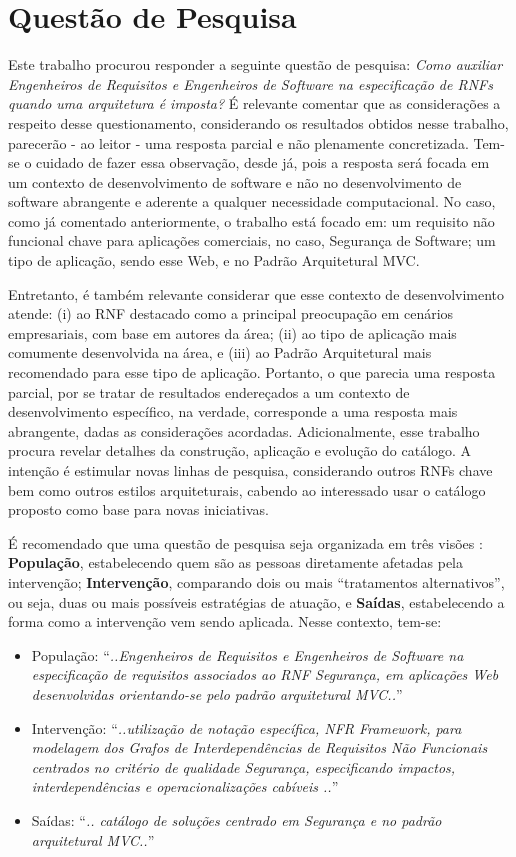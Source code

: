 \section{Questão de Pesquisa}
Este trabalho procurou responder a seguinte questão de pesquisa: \textit{Como auxiliar Engenheiros de Requisitos e Engenheiros de Software na especificação de RNFs quando uma arquitetura é imposta?} É relevante comentar que as considerações a respeito desse questionamento, considerando os resultados obtidos nesse trabalho, parecerão - ao leitor - uma resposta parcial e não plenamente concretizada. Tem-se o cuidado de fazer essa observação, desde já, pois a resposta será focada em um contexto de desenvolvimento de software e não no desenvolvimento de software abrangente e aderente a qualquer necessidade computacional. No caso, como já comentado anteriormente, o trabalho está focado em: um requisito não funcional chave para aplicações comerciais, no caso, Segurança de Software; um tipo de aplicação, sendo esse Web, e no Padrão Arquitetural MVC. 

Entretanto, é também relevante considerar que esse contexto de desenvolvimento atende: (i) ao RNF destacado como a principal preocupação em cenários empresariais, com base em autores da área; (ii) ao tipo de aplicação mais comumente desenvolvida na área, e (iii) ao Padrão Arquitetural mais recomendado para esse tipo de aplicação. Portanto, o que parecia uma resposta parcial, por se tratar de resultados endereçados a um contexto de desenvolvimento específico, na verdade, corresponde a uma resposta mais abrangente, dadas as considerações acordadas. Adicionalmente, esse trabalho procura revelar detalhes da construção, aplicação e evolução do catálogo. A intenção é estimular novas linhas de pesquisa, considerando outros RNFs chave bem como outros estilos arquiteturais, cabendo ao interessado usar o catálogo proposto como base para novas iniciativas.

É recomendado que uma questão de pesquisa seja organizada em três visões \cite{keele2007guidelines}: 
\textbf{População}, estabelecendo quem são as pessoas diretamente afetadas pela intervenção; \textbf{Intervenção}, comparando dois ou mais “tratamentos alternativos”, ou seja, duas ou mais possíveis estratégias de atuação, e \textbf{Saídas}, estabelecendo a forma como a intervenção vem sendo aplicada. Nesse contexto, tem-se: 

\begin{itemize}
	\item População: “\textit{..Engenheiros de Requisitos e Engenheiros de Software na especificação de requisitos associados ao RNF Segurança, em aplicações Web desenvolvidas orientando-se pelo padrão arquitetural MVC..}”
	\item Intervenção: “\textit{..utilização de notação específica, NFR \textit{Framework}, para modelagem dos Grafos de Interdependências de Requisitos Não Funcionais centrados no critério de qualidade Segurança, especificando impactos, interdependências e operacionalizações cabíveis  ..}”
	\item Saídas: “\textit{.. catálogo de soluções centrado em Segurança e no padrão arquitetural MVC..}”
\end{itemize}
